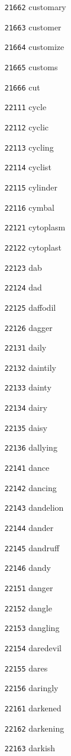 \documentclass[twoside,11pt]{article}
\begin{document}
\begin{multicols}{5}
\begin{enumerate}
\item[\texttt{21662}] customary
\item[\texttt{21663}] customer
\item[\texttt{21664}] customize
\item[\texttt{21665}] customs
\item[\texttt{21666}] cut
\item[\texttt{22111}] cycle
\item[\texttt{22112}] cyclic
\item[\texttt{22113}] cycling
\item[\texttt{22114}] cyclist
\item[\texttt{22115}] cylinder
\item[\texttt{22116}] cymbal
\item[\texttt{22121}] cytoplasm
\item[\texttt{22122}] cytoplast
\item[\texttt{22123}] dab
\item[\texttt{22124}] dad
\item[\texttt{22125}] daffodil
\item[\texttt{22126}] dagger
\item[\texttt{22131}] daily
\item[\texttt{22132}] daintily
\item[\texttt{22133}] dainty
\item[\texttt{22134}] dairy
\item[\texttt{22135}] daisy
\item[\texttt{22136}] dallying
\item[\texttt{22141}] dance
\item[\texttt{22142}] dancing
\item[\texttt{22143}] dandelion
\item[\texttt{22144}] dander
\item[\texttt{22145}] dandruff
\item[\texttt{22146}] dandy
\item[\texttt{22151}] danger
\item[\texttt{22152}] dangle
\item[\texttt{22153}] dangling
\item[\texttt{22154}] daredevil
\item[\texttt{22155}] dares
\item[\texttt{22156}] daringly
\item[\texttt{22161}] darkened
\item[\texttt{22162}] darkening
\item[\texttt{22163}] darkish

\end{enumerate}
\end{multicols}
\end{document}
